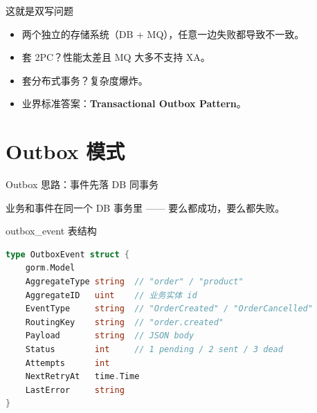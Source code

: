 \begin{frame}{这就是双写问题}
\begin{itemize}
  \item 两个独立的存储系统（DB + MQ），任意一边失败都导致不一致。
  \item 套 2PC？性能太差且 MQ 大多不支持 XA。
  \item 套分布式事务？复杂度爆炸。
  \item 业界标准答案：\textbf{Transactional Outbox Pattern}。
\end{itemize}
\end{frame}

\section{Outbox 模式}

\begin{frame}{Outbox 思路：事件先落 DB 同事务}
\vspace{2mm}
\small 业务和事件在同一个 DB 事务里 —— 要么都成功，要么都失败。
\end{frame}

\begin{frame}[fragile]{outbox\_event 表结构}
\begin{lstlisting}[language=Go,firstnumber=17,
  caption={\srcnote{repository/db/model/outbox.go:17--37}}]
type OutboxEvent struct {
    gorm.Model
    AggregateType string  // "order" / "product"
    AggregateID   uint    // 业务实体 id
    EventType     string  // "OrderCreated" / "OrderCancelled"
    RoutingKey    string  // "order.created"
    Payload       string  // JSON body
    Status        int     // 1 pending / 2 sent / 3 dead
    Attempts      int
    NextRetryAt   time.Time
    LastError     string
}
\end{lstlisting}
\end{frame}

